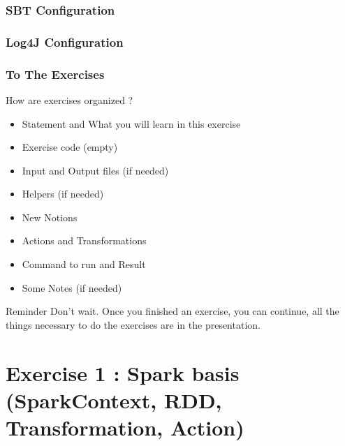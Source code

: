 \documentclass[slidetop,9pt,utf8]{beamer}
\begin{document}
\begin{frame}
  \frametitle{SBT Configuration}

  

\end{frame}

\begin{frame}
  \frametitle{Log4J Configuration}

  

\end{frame}

\begin{frame}

  \frametitle{To The Exercises}

  \begin{block}{How are exercises organized ?}
    \begin{itemize}
      \item Statement and What you will learn in this exercise
      \item Exercise code (empty)
      \item Input and Output files (if needed)
      \item Helpers (if needed)
      \item New Notions
      \item Actions and Transformations
      \item Command to run and Result
      \item Some Notes (if needed)
    \end{itemize}
  \end{block}

  \begin{block}{Reminder}
    Don't wait. Once you finished an exercise, you can continue, all the things necessary to do the exercises are in the presentation.
  \end{block}

\end{frame}

%
%
%
%

\section{Exercise 1 : Spark basis (SparkContext, RDD, Transformation, Action)}
\end{document}
